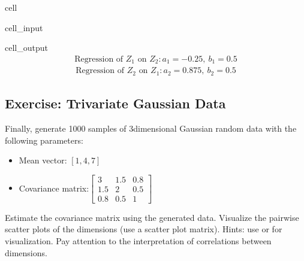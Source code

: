 \documentclass[letterpaper,10pt,english]{jupyterBook}
\begin{document}
\begin{sphinxuseclass}{cell}
\begin{sphinxVerbatimInput}
\begin{sphinxuseclass}{cell_input}
\end{sphinxuseclass}\end{sphinxVerbatimInput}
\begin{sphinxVerbatimOutput}

\begin{sphinxuseclass}{cell_output}\begin{equation*}
\begin{split}\displaystyle \text{Regression of }Z_1\text{ on }Z_2: a_1 =-0.25,\ b_1 =0.5\end{split}
\end{equation*}\begin{equation*}
\begin{split}\displaystyle \text{Regression of }Z_2\text{ on }Z_1: a_2 =0.875,\ b_2 =0.5\end{split}
\end{equation*}
\noindent{}

\end{sphinxuseclass}\end{sphinxVerbatimOutput}

\end{sphinxuseclass}

\subsection{Exercise: Trivariate Gaussian Data}
\label{\detokenize{01:exercise-trivariate-gaussian-data}}
\sphinxAtStartPar
Finally, generate 1000 samples of 3\sphinxhyphen{}dimensional Gaussian random data with the following parameters:
\begin{itemize}
\item {} 
\sphinxAtStartPar
Mean vector: \([1, 4, 7]\)

\item {} 
\sphinxAtStartPar
Covariance matrix:\(\begin{bmatrix}3&1.5&0.8\\1.5&2&0.5\\0.8&0.5&1\end{bmatrix}\)

\end{itemize}

\sphinxAtStartPar
Estimate the covariance matrix using the generated data. Visualize the pairwise scatter plots of the dimensions (use a scatter plot matrix).
Hints: use  or  for visualization.
Pay attention to the interpretation of correlations between dimensions.
\end{document}
